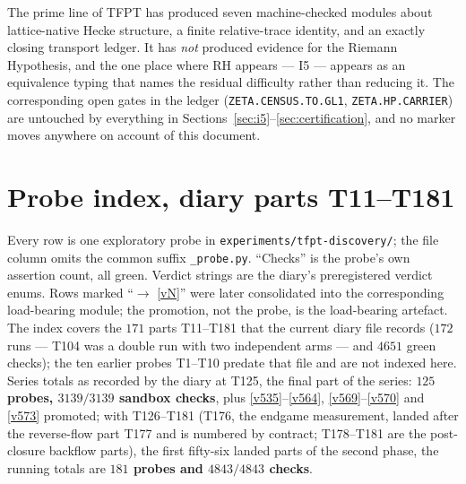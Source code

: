 \documentclass[11pt,a4paper]{article}
\begin{document}
\begin{gapboxnb}
The prime line of TFPT has produced seven machine-checked modules about lattice-native Hecke structure,
a finite relative-trace identity, and an exactly closing transport ledger. It has \emph{not} produced
evidence for the Riemann Hypothesis, and the one place where RH appears --- I5 --- appears as an
equivalence typing that names the residual difficulty rather than reducing it. The corresponding open
gates in the ledger (\texttt{ZETA.CENSUS.TO.GL1}, \texttt{ZETA.HP.CARRIER}) are untouched by everything
in Sections~\ref{sec:i5}--\ref{sec:certification}, and no marker moves anywhere on account of this
document.
\end{gapboxnb}

\appendix
\section{Probe index, diary parts T11--T181}\label{app:index}
\noindent Every row is one exploratory probe in \texttt{experiments/tfpt-discovery/}; the file column
omits the common suffix \texttt{\_probe.py}. ``Checks'' is the probe's own assertion count, all green.
Verdict strings are the diary's preregistered verdict enums. Rows marked ``$\to$ \vref{vN}'' were later
consolidated into the corresponding load-bearing module; the promotion, not the probe, is the
load-bearing artefact. The index covers the $171$ parts T11--T181 that the current diary file
records ($172$ runs --- T104 was a double run with two independent arms --- and $4651$ green checks);
the ten earlier probes T1--T10 predate that file and are not indexed here. Series totals as recorded
by the diary at T125, the final part of the series: \textbf{$125$ probes, $3139/3139$ sandbox checks},
plus \vref{v535}--\vref{v564}, \vref{v569}--\vref{v570} and \vref{v573} promoted; with T126--T181 (T176, the endgame measurement, landed after
the reverse-flow part T177 and is numbered by contract; T178--T181 are the post-closure backflow parts), the
first fifty-six landed parts of the second phase, the running totals are \textbf{$181$ probes and
$4843/4843$ checks}.
\end{document}
